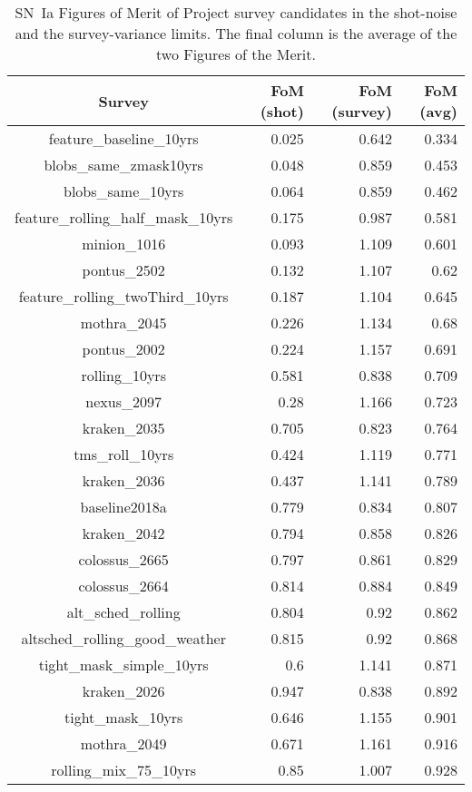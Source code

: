 \begin{table}
\caption{SN~Ia Figures of Merit of Project survey candidates
in  the shot-noise and the survey-variance limits.  The final column is the average
of the two Figures of the Merit.\label{table:ref}}
\centering
\begin{tabular}{crrr}
  \hline
  \hline
Survey & FoM (shot) & FoM (survey) & FoM (avg)\\
\hline
\hline
feature\_baseline\_10yrs & 0.025 & 0.642 & 0.334  \\
blobs\_same\_zmask10yrs & 0.048 & 0.859 & 0.453  \\
blobs\_same\_10yrs & 0.064 & 0.859 & 0.462  \\
feature\_rolling\_half\_mask\_10yrs & 0.175 & 0.987 & 0.581  \\
minion\_1016 & 0.093 & 1.109 & 0.601  \\
pontus\_2502 & 0.132 & 1.107 & 0.62  \\
feature\_rolling\_twoThird\_10yrs & 0.187 & 1.104 & 0.645  \\
mothra\_2045 & 0.226 & 1.134 & 0.68  \\
pontus\_2002 & 0.224 & 1.157 & 0.691  \\
rolling\_10yrs & 0.581 & 0.838 & 0.709  \\
nexus\_2097 & 0.28 & 1.166 & 0.723  \\
kraken\_2035 & 0.705 & 0.823 & 0.764  \\
tms\_roll\_10yrs & 0.424 & 1.119 & 0.771  \\
kraken\_2036 & 0.437 & 1.141 & 0.789  \\
baseline2018a & 0.779 & 0.834 & 0.807  \\
kraken\_2042 & 0.794 & 0.858 & 0.826  \\
colossus\_2665 & 0.797 & 0.861 & 0.829  \\
colossus\_2664 & 0.814 & 0.884 & 0.849  \\
alt\_sched\_rolling & 0.804 & 0.92 & 0.862  \\
altsched\_rolling\_good\_weather & 0.815 & 0.92 & 0.868  \\
tight\_mask\_simple\_10yrs & 0.6 & 1.141 & 0.871  \\
kraken\_2026 & 0.947 & 0.838 & 0.892  \\
tight\_mask\_10yrs & 0.646 & 1.155 & 0.901  \\
mothra\_2049 & 0.671 & 1.161 & 0.916  \\
rolling\_mix\_75\_10yrs & 0.85 & 1.007 & 0.928  \\

\end{tabular}
\end{table}
